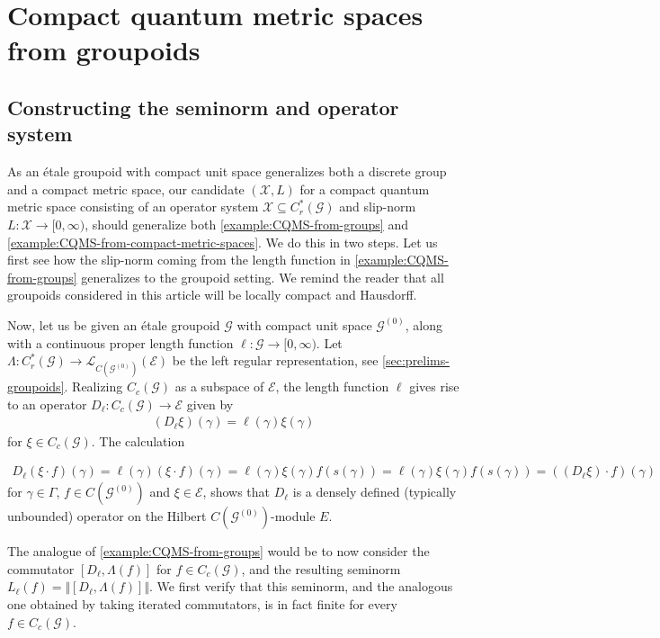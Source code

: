 \documentclass[11pt,a4paper,oneside,final,reqno]{amsart}
\theoremstyle{definition}
\newcommand{\G}{\mathcal{G}}
\newcommand{\Go}{\mathcal{G}^{(0)}}
\newcommand{\E}{\mathcal{E}}
\newcommand{\cX}{\mathcal{X}}
\newcommand{\curlyL}{\mathcal{L}}
\newcommand{\Cred}{C_{r}^{*}}
\numberwithin{equation}{section}
\begin{document}
	
	
	
	
	\section{Compact quantum metric spaces from groupoids}\label{sec:CQMS-from-groupoids}
	\subsection{Constructing the seminorm and operator system}
	As an \'etale groupoid with compact unit space generalizes both a discrete group and a compact metric space, our candidate $(\cX, L)$ for a compact quantum metric space consisting of an operator system $\cX \subseteq \Cred (\G)$ and slip-norm $L\colon \cX \to [0,\infty)$, should generalize both \cref{example:CQMS-from-groups} and \cref{example:CQMS-from-compact-metric-spaces}. We do this in two steps. Let us first see how the slip-norm coming from the length function in \cref{example:CQMS-from-groups} generalizes to the groupoid setting. We remind the reader that all groupoids considered in this article will be 
	locally compact and Hausdorff.
	
	Now, let us be given an \'etale groupoid $\G$ with compact unit space $\Go$, along with a continuous 
	proper length function $\ell\colon \G \to [0,\infty)$.
	Let $\Lambda \colon \Cred (\G) \to \curlyL_{C(\Go)}(\E)$ be the left regular representation, see \cref{sec:prelims-groupoids}. Realizing $C_c(\G)$ as a subspace of $\E$,
	the length function $\ell$ gives rise to an operator $D_\ell \colon  C_c (\G) \to \E$ given by
	\begin{align}\label{eq:def-action-of-Dell}
		(D_\ell \xi) (\gamma) = \ell(\gamma) \xi(\gamma) 
	\end{align}
	for $\xi \in C_c (\G)$. 
	The calculation
	
	\begin{align*}
		D_\ell(  \xi \cdot f)(\gamma) = \ell(\gamma) (\xi \cdot f)(\gamma) = \ell(\gamma) \xi(\gamma)f(s(\gamma)) =  \ell(\gamma) \xi(\gamma) f(s(\gamma)) =  ((D_\ell \xi)\cdot f)(\gamma)
	\end{align*}
	for $\gamma \in \Gamma$, $f \in C(\Go)$ and $\xi \in \E$, shows that $D_\ell$ is a
	densely defined 
	(typically unbounded) operator on the Hilbert $C(\Go)$-module $E$. 
	
	The analogue of \cref{example:CQMS-from-groups} would be to now consider the commutator $[D_\ell , \Lambda (f)]$ for $f \in C_c (\G)$, and the resulting seminorm $L_\ell (f) = \Vert [D_\ell, \Lambda (f)]\Vert$. We first verify that this seminorm, and the analogous one obtained by taking iterated commutators, is in fact finite for every $f \in C_c (\G)$.
	
\end{document}
